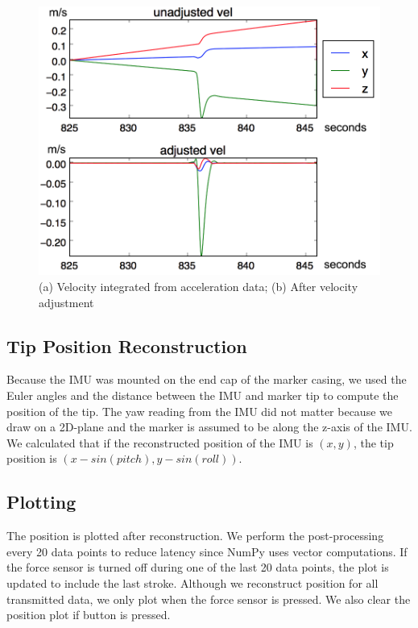 \documentclass[12pt,journal]{IEEEtran}
\begin{document}
\begin{figure}[h]
  \centering
    \includegraphics[width=\linewidth]{figures/vel-adjust}
  \caption{(a) Velocity integrated from acceleration data; (b) After velocity adjustment}
  \label{fig:vel-adjust}
\end{figure}

\subsection{Tip Position Reconstruction}
Because the IMU was mounted on the end cap of the marker casing, we used the Euler angles and the distance between the IMU and marker tip to compute the position of the tip. The yaw reading from the IMU did not matter because we draw on a 2D-plane and the marker is assumed to be along the z-axis of the IMU. We calculated that if the reconstructed position of the IMU is $(x,y)$, the tip position is $(x-sin(pitch), y-sin(roll))$.

\subsection{Plotting}
  The position is plotted after reconstruction. We perform the post-processing every 20 data points to reduce latency since NumPy uses vector computations. If the force sensor is turned off during one of the last 20 data points, the plot is updated to include the last stroke. Although we reconstruct position for all transmitted data, we only plot when the force sensor is pressed. We also clear the position plot if button is pressed. 
\end{document}

